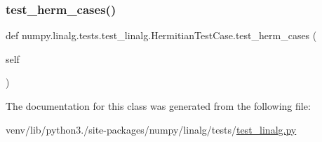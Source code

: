 \subsubsection{\texorpdfstring{test\+\_\+herm\+\_\+cases()}{test\_herm\_cases()}}
{\footnotesize\ttfamily def numpy.\+linalg.\+tests.\+test\+\_\+linalg.\+Hermitian\+Test\+Case.\+test\+\_\+herm\+\_\+cases (\begin{DoxyParamCaption}\item[{}]{self }\end{DoxyParamCaption})}



The documentation for this class was generated from the following file\+:\begin{DoxyCompactItemize}
\item 
venv/lib/python3./site-\/packages/numpy/linalg/tests/\hyperlink{test__linalg_8py}{test\+\_\+linalg.\+py}\end{DoxyCompactItemize}
